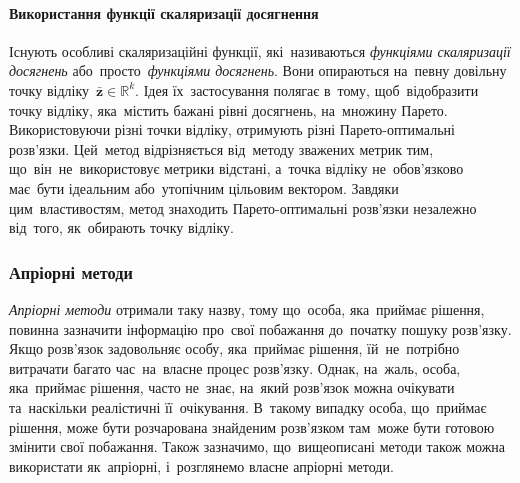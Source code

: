 \documentclass[
  a4paper,
  oneside,
  BCOR = 10mm,
  DIV = 12,
  12pt,
  headings = normal,
]{scrartcl}
\newcommand{\vect}[1]{\mathbf{#1}}
\begin{document}
      \paragraph{Використання функції скаляризації досягнення}
        Існують особливі скаляризаційні функції, які~називаються \emph{функціями скаляризації досягнень} або~просто~\emph{функціями досягнень}. Вони опираються на~певну довільну точку відліку~$\bar{\vect{z}} \in \mathbb{R}^k$. Ідея їх~застосування полягає в~тому, щоб~відобразити точку відліку, яка~містить бажані рівні досягнень, на~множину Парето. Використовуючи різні точки відліку, отримують різні Парето-оптимальні розв'язки. Цей~метод відрізняється від~методу зважених метрик тим, що~він~не~використовує метрики відстані, а~точка відліку не~обов'язково має~бути ідеальним або~утопічним цільовим вектором. Завдяки цим~властивостям, метод знаходить Парето-оптимальні розв'язки незалежно від~того, як~обирають точку відліку.

    \subsubsection{Апріорні методи}
      \emph{Апріорні методи} отримали таку назву, тому що~особа, яка~приймає рішення, повинна зазначити інформацію про~свої побажання до~початку пошуку розв'язку. Якщо розв'язок задовольняє особу, яка~приймає рішення, їй~не~потрібно витрачати багато час~на~власне процес розв'язку. Однак, на~жаль, особа, яка~приймає рішення, часто не~знає, на~який розв'язок можна очікувати та~наскільки реалістичні її~очікування. В~такому випадку особа, що~приймає рішення, може бути розчарована знайденим розв'язком там~може бути готовою змінити свої побажання. Також зазначимо, що~вищеописані методи також можна використати як~апріорні, і~розглянемо власне апріорні методи.
\end{document}
